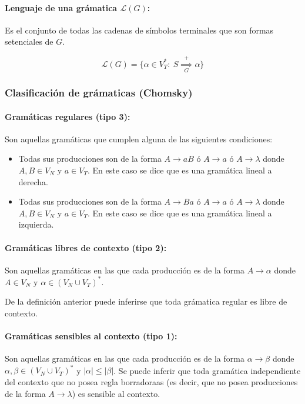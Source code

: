 \paragraph{Lenguaje de una grámatica \(\mathcal{L}(G)\):} Es el conjunto de todas las cadenas de símbolos terminales que son formas setenciales de \(G\).

\[ \mathcal{L}(G) = \{ \alpha\in V_T^*:~S\overset{+}{\underset{G}{\implies}}\alpha\}\]

\subsubsection{Clasificación de grámaticas (Chomsky)}
\paragraph{Gramáticas regulares (tipo 3):} Son aquellas gramáticas que cumplen alguna de las siguientes condiciones:
\begin{itemize}
  \item Todas sus producciones son de la forma \(A\to aB\) ó \(A\to a\) ó \(A\to\lambda\) donde \(A,B\in V_N\) y \(a\in V_T\). En este caso se dice que es una gramática lineal a derecha.
  \item Todas sus producciones son de la forma \(A\to Ba\) ó \(A\to a\) ó \(A\to\lambda\) donde \(A,B\in V_N\) y \(a\in V_T\). En este caso se dice que es una gramática lineal a izquierda.
\end{itemize}

\paragraph{Gramáticas libres de contexto (tipo 2):} Son aquellas gramáticas en las que cada producción es de la forma \(A\to\alpha\) donde \(A\in V_N\) y \(\alpha\in(V_N\cup V_T)^*\).

De la definición anterior puede inferirse que toda grámatica regular es libre de contexto.

\paragraph{Gramáticas sensibles al contexto (tipo 1):} Son aquellas gramáticas en las que cada producción es de la forma \(\alpha\to\beta\) donde \(\alpha,\beta\in(V_N\cup V_T)^*\) y \(|\alpha|\leq |\beta|\).
Se puede inferir que toda gramática independiente del contexto que no posea regla borradoraas (es decir, que no posea producciones de la forma \(A\to\lambda\)) es sensible al contexto.

